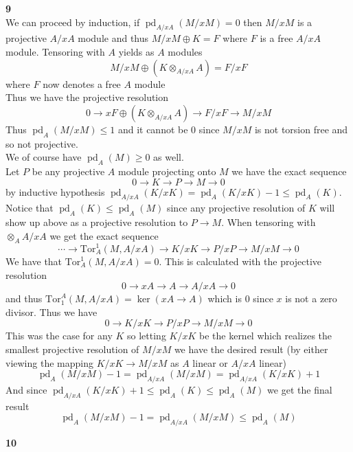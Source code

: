\documentclass[12pt]{article}
\newenvironment{ques}[1]{\textbf{#1}\vspace{1 mm}\\ }{\bigskip}
\theoremstyle{definition}
\DeclareMathOperator\pd{pd}
\DeclareMathOperator\Ext{Ext}
\newcommand{\tensor}{\otimes}
\newcommand{\Tor}{\text{Tor}}
\begin{document}
\begin{ques}{9}
	We can proceed by induction, if $\pd_{A/xA}(M/xM) = 0$ then $M/xM$ is a
	projective $A/xA$ module and thus $M/xM \oplus K = F$ where $F$ is a free
	$A/xA$ module. Tensoring with $A$ yields as $A$ modules
	$$M/xM \oplus (K \tensor_{A/xA} A) = F/xF$$
	where $F$ now denotes a free $A$ module\\
	Thus we have the projective resolution
	$$0 \to xF \oplus (K \tensor_{A/xA} A) \to F/xF \to M/xM$$
	Thus $\pd_A(M/xM) \leq 1$ and it cannot be $0$ since $M/xM$ is not
	torsion free and so not projective.
	\\
	We of course have $\pd_A(M) \geq 0$ as well. \\
	Let $P$ be any projective $A$ module projecting onto $M$ we have the exact sequence
	$$0 \to K \to P \to M \to 0$$
	by inductive hypothesis $\pd_{A/xA}(K/xK) = \pd_A(K/xK) - 1 \leq \pd_A(K)$.
	Notice that $\pd_A(K) \leq \pd_A(M)$ since any projective resolution of $K$
	will show up above as a projective resolution to $P \to M$. When tensoring
	with $\tensor_A A/xA$ we get the exact sequence 
	$$\cdots \to \Tor_A^1(M,A/xA) \to K/xK \to P/xP \to M/xM \to 0$$
	We have that $\Tor_A^1(M,A/xA) = 0$. This is calculated with the projective
	resolution
	$$0 \to xA \to A \to A/xA \to 0$$
	and thus $\Tor_1^A(M,A/xA) = \ker(xA \to A)$ which is $0$ since $x$ is not
	a zero divisor. Thus we have 
	$$0 \to K/xK \to P/xP \to M/xM \to 0$$
	This was the case for any $K$ so letting $K/xK$ be the kernel which realizes
	the smallest projective resolution of $M/xM$ we have the desired result (by
	either viewing the mapping $K/xK \to M/xM$ as $A$ linear or $A/xA$ linear)
	$$\pd_A(M/xM) - 1 = \pd_{A/xA}(M/xM) = \pd_{A/xA}(K/xK) + 1$$
	And since $\pd_{A/xA}(K/xK) + 1 \leq \pd_A(K) \leq \pd_A(M)$ we get the
	final result
	$$\pd_A(M/xM) - 1 = \pd_{A/xA}(M/xM) \leq \pd_A(M)$$
\end{ques}

\begin{ques}{10}
\end{ques}
\end{document}
